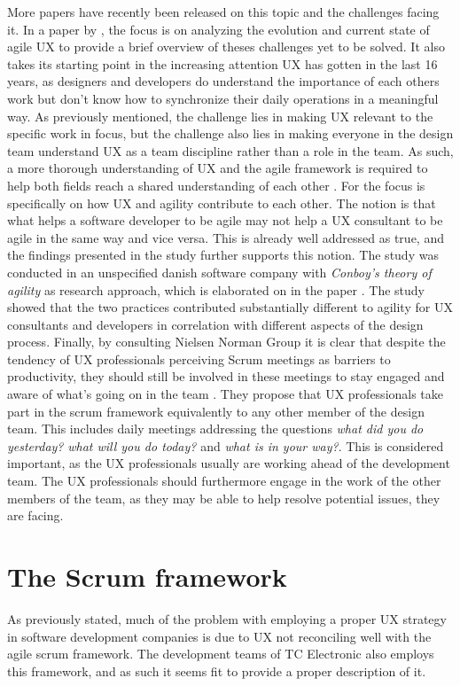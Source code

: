 \noindent
More papers have recently been released on this topic and the challenges facing it. In a paper by \textcite{PDF:EvolutionofagileUXD}, the focus is on analyzing the evolution and current state of agile UX to provide a brief overview of theses challenges yet to be solved. It also takes its starting point in the increasing attention UX has gotten in the last 16 years, as designers and developers do understand the importance of each others work but don't know how to synchronize their daily operations in a meaningful way. As previously mentioned, the challenge lies in making UX relevant to the specific work in focus, but the challenge also lies in making everyone in the design team understand UX as a team discipline rather than a role in the team. As such, a more thorough understanding of UX and the agile framework is required to help both fields reach a shared understanding of  each other \parencite[][2]{PDF:EvolutionofagileUXD}. For \textcite{WEB:AgilityForUX} the focus is specifically on how UX and agility contribute to each other. The notion is that what helps a software developer to be agile may not help a UX consultant to be agile in the same way and vice versa. This is already well addressed as true, and the findings presented in the study further supports this notion. The study was conducted in an unspecified danish software company with \textit{Conboy's theory of agility} as research approach, which is elaborated on in the paper \parencite[][3]{WEB:AgilityForUX}. The study showed that the two practices contributed substantially different to agility for UX consultants and developers in correlation with different aspects of the design process. Finally, by consulting Nielsen Norman Group it is clear that despite the tendency of UX professionals perceiving Scrum meetings as barriers to productivity, they should still be involved in these meetings to stay engaged and aware of what's going on in the team \parencite{WEB:UXResponsibilitiesInScrum}. They propose that UX professionals take part in the scrum framework equivalently to any other member of the design team. This includes daily meetings addressing the questions \textit{what did you do yesterday?} \textit{what will you do today?} and \textit{what is in your way?}. This is considered important, as the UX professionals usually are working ahead of the development team. The UX professionals should furthermore engage in the work of the other members of the team, as they may be able to help resolve potential issues, they are facing.
\newpage

\section{The Scrum framework}
\label{scrum}
As previously stated, much of the problem with employing a proper UX strategy in software development companies is due to UX not reconciling well with the agile scrum framework. The development teams of TC Electronic also employs this framework, and as such it seems fit to provide a proper description of it.

